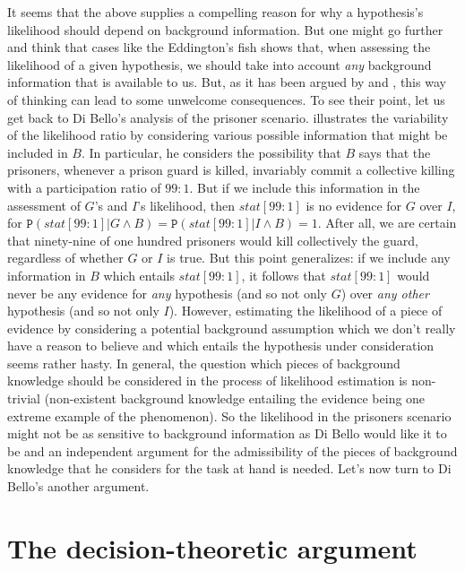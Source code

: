 \documentclass{article}
\newcommand{\pr}[1]{\mbox{$\mathtt{P}(#1)$}}
\begin{document}
It seems that the above supplies a compelling reason for why a hypothesis's likelihood should depend on background information. But one might go further and think that cases like the Eddington's fish shows that, when assessing the likelihood of a given hypothesis, we should take into account \emph{any} background information that is available to us. But, as it has been argued by \citet{Weisberg2005} and \citet{Kotzen2012}, this way of thinking can lead to some unwelcome consequences. To see their point, let us get back to Di Bello's analysis of the prisoner scenario. 
\citet[7]{dibello2019TrialStatisticsHigh} illustrates the variability of the likelihood ratio by considering various possible information that might be included in $B$. In particular, he considers the possibility that $B$ says that the prisoners, whenever a prison guard is killed, invariably commit a collective killing with a participation
ratio of $99:1$. But if we include this information in the assessment of $G$'s and $I$'s likelihood, then $stat[99:1]$ is no evidence for $G$ over $I$, for $\pr{stat\left[99:1 \right]  \vert G \wedge B} = \pr{stat\left[99:1 \right]  \vert I \wedge B} = 1$. After all, we are certain that ninety-nine of one hundred prisoners would kill collectively the guard, regardless of whether $G$ or $I$ is true. But this point generalizes: if we include any information in $B$ which entails $stat[99:1]$, it follows that $stat[99:1]$ would never be any evidence for \emph{any} hypothesis (and so not only $G$) over \emph{any other} hypothesis (and so not only $I$). However, estimating the likelihood of a piece of evidence by considering a potential background assumption which we don't really have a reason to believe and which entails the hypothesis under consideration seems rather hasty. In general, the question which pieces of background knowledge should be considered in the process of likelihood estimation is non-trivial (non-existent background knowledge entailing the evidence being one extreme example of the phenomenon). So the likelihood in the prisoners scenario might not be as sensitive to background information as Di Bello would like it to be and   an independent argument for the admissibility of the pieces of background knowledge that he considers for the task at hand is needed.   Let's now turn to Di Bello's another argument.


\section{The decision-theoretic argument}\label{sec:decision}
\end{document}
